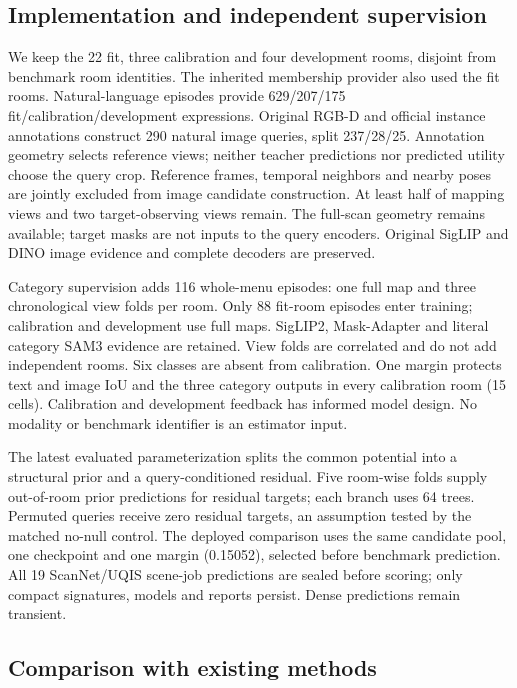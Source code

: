 \subsection{Implementation and independent supervision}
We keep the 22 fit, three calibration and four development rooms, disjoint from
benchmark room identities. The inherited membership provider also used the fit
rooms. Natural-language episodes provide 629/207/175 fit/calibration/development
expressions. Original RGB-D and official instance annotations construct 290
natural image queries, split 237/28/25. Annotation geometry selects reference
views; neither teacher predictions nor predicted utility choose the query crop.
Reference frames, temporal neighbors and nearby poses are jointly excluded from
image candidate construction. At least half of mapping views and two
target-observing views remain. The full-scan geometry remains available; target
masks are not inputs to the query encoders. Original SigLIP and DINO image
evidence and complete decoders are preserved.

Category supervision adds 116 whole-menu episodes: one full map and three
chronological view folds per room. Only 88 fit-room episodes enter training;
calibration and development use full maps. SigLIP2, Mask-Adapter and literal
category SAM3 evidence are retained. View folds are correlated and do not add
independent rooms. Six classes are absent from calibration. One margin protects
text and image IoU and the three category outputs in every calibration room
(15 cells). Calibration and development feedback has informed model design.
No modality or benchmark identifier is an estimator input.

The latest evaluated parameterization splits the common potential into a
structural prior and a query-conditioned residual. Five room-wise folds supply
out-of-room prior predictions for residual targets; each branch uses 64 trees.
Permuted queries receive zero residual targets, an assumption tested by the
matched no-null control. The deployed comparison uses the same candidate pool,
one checkpoint and one margin (0.15052), selected before benchmark prediction.
All 19 ScanNet/UQIS scene-job predictions are sealed before scoring; only compact
signatures, models and reports persist. Dense predictions remain transient.

\subsection{Comparison with existing methods}

